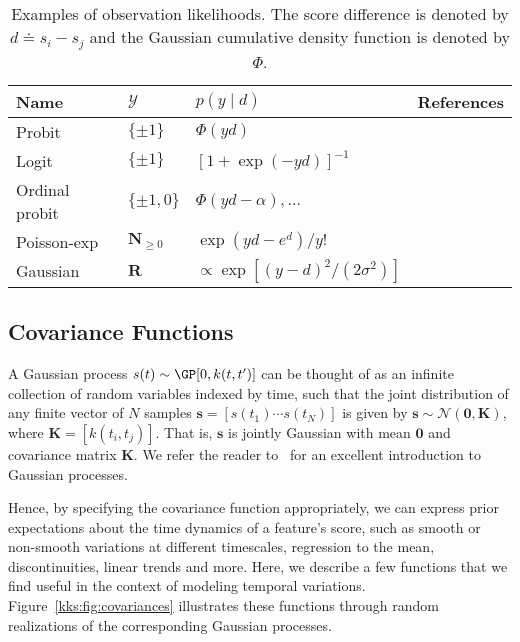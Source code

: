 \begin{table}[t]
	\caption{
		Examples of observation likelihoods.
		The score difference is denoted by $d \doteq s_i - s_j$ and the Gaussian cumulative density function is denoted by $\Phi$.
	}
	\label{kks:tab:likelihoods}
	\centering
	\begin{tabular}{l lll}
		\toprule
		Name           & $\mathcal{Y}$        & $p(y \mid d)$                           & References                                      \\
		\midrule
		Probit         & $\{\pm 1 \}$         & $\Phi(yd)$                              & \citep{thurstone1927law, herbrich2006trueskill} \\
		Logit          & $\{\pm 1 \}$         & $[1 + \exp(-yd)]^{-1}$                  & \citep{zermelo1928berechnung, bradley1952rank}  \\
		Ordinal probit & $\{\pm 1, 0 \}$      & $\Phi(yd - \alpha), \ldots$             & \citep{glenn1960ties}                           \\
		Poisson-exp    & $\mathbf{N}_{\ge 0}$ & $\exp(yd - e^d) / y!$                   & \citep{maher1982modelling}                      \\
		Gaussian       & $\mathbf{R}$         & $\propto \exp[(y - d)^2 / (2\sigma^2)]$ & \citep{guo2012score}                            \\
		\bottomrule
	\end{tabular}
\end{table}


\subsection{Covariance Functions}
\label{kks:sec:covariances}

A Gaussian process $s(t) \sim \GP[0, k(t, t')]$ can be thought of as an infinite collection of random variables indexed by time, such that the joint distribution of any finite vector of $N$ samples $\bm{s} = [s(t_1) \cdots s(t_N)]$ is given by $\bm{s} \sim \mathcal{N}(\bm{0}, \bm{K})$, where $\bm{K} = [k(t_i, t_j)]$.
That is, $\bm{s}$ is jointly Gaussian with mean $\bm{0}$ and covariance matrix $\bm{K}$.
We refer the reader to~\citet{rasmussen2006gaussian} for an excellent introduction to Gaussian processes.

Hence, by specifying the covariance function appropriately, we can express prior expectations about the time dynamics of a feature's score, such as smooth or non-smooth variations at different timescales, regression to the mean, discontinuities, linear trends and more.
Here, we describe a few functions that we find useful in the context of modeling temporal variations.
Figure~\ref{kks:fig:covariances} illustrates these functions through random realizations of the corresponding Gaussian processes.

